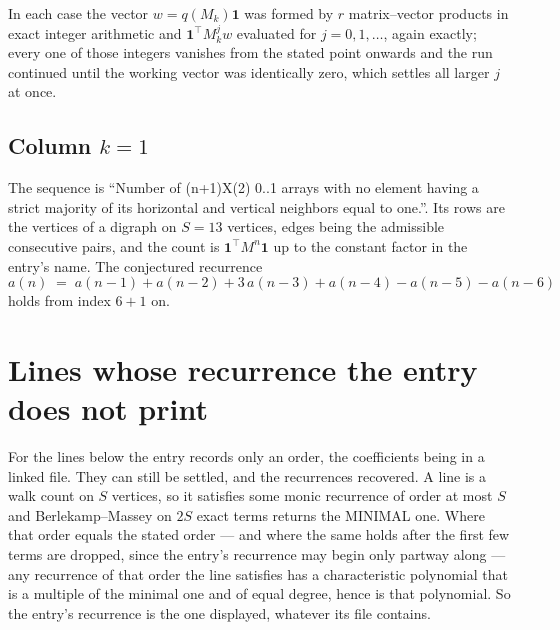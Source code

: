 \documentclass[11pt,a4paper]{article}
\theoremstyle{plain}
\theoremstyle{definition}
\begin{document}
In each case the vector $w=q(M_k)\mathbf{1}$ was formed by $r$ matrix--vector products in
exact integer arithmetic and $\mathbf{1}^{\!\top}M_k^{j}w$ evaluated for $j=0,1,\dots$,
again exactly; every one of those integers vanishes from the stated point onwards and the run
continued until the working vector was identically zero, which settles all larger $j$ at once.

\subsection*{Column $k$$=1$}
The sequence is ``Number of (n+1)X(2) 0..1 arrays with no element having a strict majority of its horizontal and vertical neighbors equal to one.''. Its rows are the vertices of a digraph on
$S=13$ vertices, edges being the admissible consecutive pairs, and the count is
$\mathbf{1}^{\!\top}M^{n}\mathbf{1}$ up to the constant factor in the entry's name.
The conjectured recurrence
\[
a(n)\;=\;a(n-1) + a(n-2) + 3\,a(n-3) + a(n-4) - a(n-5) - a(n-6)
\]
holds from index $6+1$ on.


\section{Lines whose recurrence the entry does not print}

For the lines below the entry records only an order, the coefficients being in a linked file.
They can still be settled, and the recurrences recovered. A line is a walk count on $S$
vertices, so it satisfies some monic recurrence of order at most $S$ and Berlekamp--Massey on
$2S$ exact terms returns the MINIMAL one. Where that order equals the stated order --- and
where the same holds after the first few terms are dropped, since the entry's recurrence may
begin only partway along --- any recurrence of that order the line satisfies has a
characteristic polynomial that is a multiple of the minimal one and of equal degree, hence is
that polynomial. So the entry's recurrence is the one displayed, whatever its file contains.
\end{document}
